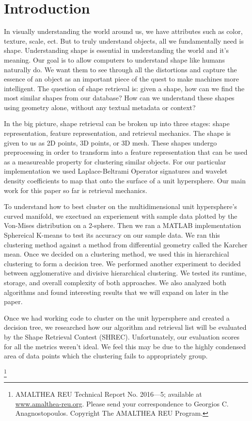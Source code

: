 \documentclass[../tech_report_1.tex]{subfiles}
\newcommand\blfootnote[1]{%
  \begingroup
  \renewcommand\thefootnote{}\footnote{#1}%
  \addtocounter{footnote}{-1}%
  \endgroup
}
\begin{document}
\section{Introduction}
In visually understanding the world around us, we have attributes such as color, texture, scale, ect. But to truly understand objects, all we fundamentally need is shape. Understanding shape is essential in understanding the world and it's meaning. Our goal is to allow computers to understand shape like humans naturally do. We want them to see through all the distortions and capture the essence of an object as an important piece of the quest to make machines more intelligent. The question of shape retrieval is: given a shape, how can we find the most similar shapes from our database? How can we understand these shapes using geometry alone, without any textual metadata or context? 

In the big picture, shape retrieval can be broken up into three stages:
shape representation, feature representation, and retrieval mechanics. The shape is given to us as 2D points, 3D points, or 3D mesh. These shapes undergo preprocessing in order to transform into a feature representation that can be used as a measureable property for clustering similar objects. For our particular implementation we used Laplace-Beltrami Operator signatures and wavelet density coefficients to map that onto the surface of a unit hypersphere. Our main work for this paper so far is retrieval mechanics.

To understand how to best cluster on the multidimensional unit hypersphere's curved manifold, we exectued an experiement with sample data plotted by the Von-Mises distribution on a 2-sphere. Then we ran a MATLAB implementation Sphereical K-means to test its accuracy on our sample data. We ran this clustering method against a method from differential geometry called the Karcher mean. Once we decided on a clustering method, we used this in hierarchical clustering to form a decision tree. We performed another experiment to decided between agglomerative and divisive hierarchical clustering. We tested its runtime, storage, and overall complexity of both approaches. We also analyzed both algorithms and found interesting results that we will expand on later in the paper.

Once we had working code to cluster on the unit hypersphere and
created a decision tree, we researched how our algorithm and retrieval list will be evaluated by the Shape Retrieval Contest (SHREC). Unfortunately, our evaluation scores for all the metrics weren't ideal. We feel this may be due to the highly condensed area of data points which the clustering fails to appropriately group.

\blfootnote{AMALTHEA REU Technical Report No. 2016–--5; available at \href{www.amalthea-reu.org}{www.amalthea-reu.org}. Please send your correspondence to Georgios C. Anagnostopoulos. Copyright \textcopyright \thickspace 2016 The AMALTHEA REU Program.}
\end{document}
